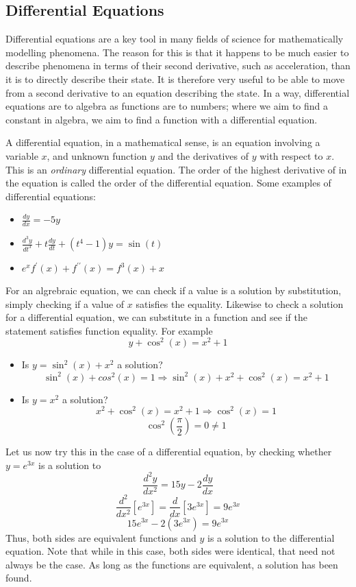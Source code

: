\documentclass[12pt]{report}
\begin{document}
\begin{flushleft}
\section*{Differential Equations}
Differential equations are a key tool in many fields of science for 
mathematically modelling phenomena. The reason for this is that it happens to
be much easier to describe phenomena in terms of their second derivative, such
as acceleration, than it is to directly describe their state. It is therefore
very useful to be able to move from a second derivative to an equation 
describing the state. In a way, differential equations are to algebra as
functions are to numbers; where we aim to find a constant in algebra, we aim to
find a function with a differential equation.

\bigskip
A differential equation, in a mathematical sense, is an equation involving a
variable \(x\), and unknown function \(y\) and the derivatives of \(y\) with
respect to \(x\). This is an \textit{ordinary} differential equation. The order
of the highest derivative of in the equation is called the order of the 
differential equation. Some examples of differential equations:
\begin{itemize}
    \item \(\frac{dy}{dx} = -5y\)
    \item \(\frac{d^3y}{dt^3} + t\frac{dy}{dt} + (t^4 - 1)y = \sin(t)\)
    \item \(e^xf^\prime(x) + f^{\prime\prime}(x) = f^3(x) + x\)
\end{itemize} 
For an algrebraic equation, we can check if a value is a solution by
substitution, simply checking if a value of \(x\) satisfies the equality. 
Likewise to check a solution for a differential equation, we can substitute in
a function and see if the statement satisfies function equality. For example
\[y + \cos^2(x) = x^2 + 1\]
\begin{itemize}
    \item Is \(y = \sin^2(x) + x^2\) a solution?
    \[\sin^2(x) + cos^2(x) = 1 
    \Rightarrow \sin^2(x) + x^2 + \cos^2(x) = x^2 + 1\]
    \item Is \(y = x^2\) a solution?
    \[x^2 + \cos^2(x) = x^2 + 1 \Rightarrow \cos^2(x) = 1\]
    \[\cos^2(\frac{\pi}{2}) = 0 \neq 1\]
\end{itemize}
Let us now try this in the case of a differential equation, by checking whether
\(y = e^{3x}\) is a solution to
\[\frac{d^2y}{dx^2} = 15y - 2\frac{dy}{dx}\]
\[\frac{d^2}{dx^2}\left[e^{3x}\right] = \frac{d}{dx}\left[3e^{3x}\right] 
= 9e^{3x}\] 
\[15e^{3x} - 2(3e^{3x}) = 9e^{3x}\]
Thus, both sides are equivalent functions and \(y\) is a solution to the 
differential equation. Note that while in this case, both sides were identical,
that need not always be the case. As long as the functions are equivalent, a
solution has been found.


\end{flushleft}
\end{document}
